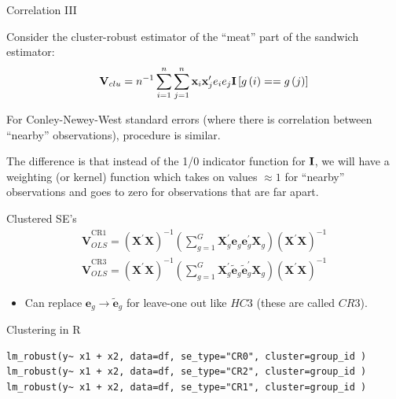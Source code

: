 \begin{frame}{Correlation III}

 Consider the cluster-robust estimator of the ``meat'' part of the sandwich estimator: \[
	{\bf V}_{clu} = n^{-1} \sum_{i=1}^{n}\sum_{j=1}^{n} {\bf x}_i {\bf x}'_j  e_i e_j {\bf I}\left[g\left(i\right)==g\left(j\right)\right]
	\]

\medskip
 For Conley-Newey-West standard errors (where there is correlation between ``nearby'' observations),
	procedure is similar.

\medskip
	 The difference is that instead of the 1/0 indicator function for ${\bf I}$, we will have a 
	weighting (or kernel) function which takes on values $\approx 1$ for ``nearby'' observations and goes to zero for
	observations that are far apart.


\end{frame}



\begin{frame}{Clustered SE's}
\begin{align*}
\widehat { \boldsymbol { V } } _ { OLS } ^ { \mathrm { CR } 1 } = \left( \boldsymbol { X } ^ { \prime } \boldsymbol { X } \right) ^ { - 1 } \left( \sum _ { g = 1 } ^ { G } \boldsymbol { X } _ { g } ^ { \prime } \boldsymbol { e }_ { g }  \boldsymbol { e }_ { g } ^ { \prime } \boldsymbol { X } _ { g } \right) \left( \boldsymbol { X } ^ { \prime } \boldsymbol { X } \right) ^ { - 1 }\\
\widehat { \boldsymbol { V } } _ { OLS } ^ { \mathrm { CR } 3 } = \left( \boldsymbol { X } ^ { \prime } \boldsymbol { X } \right) ^ { - 1 } \left( \sum _ { g = 1 } ^ { G } \boldsymbol { X } _ { g } ^ { \prime } \widetilde { \boldsymbol { e } } _ { g }  \widetilde { \boldsymbol { e } } _ { g } ^ { \prime } \boldsymbol { X } _ { g } \right) \left( \boldsymbol { X } ^ { \prime } \boldsymbol { X } \right) ^ { - 1 }
\end{align*}
\begin{itemize}
\item Can replace  $\mathbf{e}_g  \rightarrow \tilde { \mathbf{e}}_g $ for leave-one out like $HC3$ (these are called $CR3$).
\end{itemize}
\end{frame}


\begin{frame}[fragile]{Clustering in R}
\begin{lstlisting}
lm_robust(y~ x1 + x2, data=df, se_type="CR0", cluster=group_id )
lm_robust(y~ x1 + x2, data=df, se_type="CR2", cluster=group_id )
lm_robust(y~ x1 + x2, data=df, se_type="CR1", cluster=group_id )
\end{lstlisting}
\end{frame}





